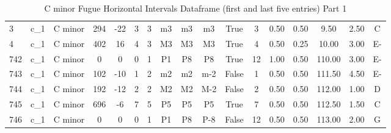 \begin{table}[H]
\begin{tabular}{|lcccccccccccccccc|}
   3   & c\_1 & C minor & 294   & -22                               & 3         & 3                                & m3                          & m3   & m3                            & True      & 3                               & 0.50                        & 0.50                        & 9.50   & 2.50 & C                        \\
   4   & c\_1 & C minor & 402   & 16                                & 4         & 3                                & M3                          & M3   & M3                            & True      & 4                               & 0.50                        & 0.25                        & 10.00  & 3.00 & E-                       \\
   742 & c\_1 & C minor & 0     & 0                                 & 0         & 1                                & P1                          & P8   & P8                            & True      & 12                              & 1.00                        & 0.50                        & 110.00 & 3.00 & E-                       \\
   743 & c\_1 & C minor & 102   & -10                               & 1         & 2                                & m2                          & m2   & m-2                           & False     & 1                               & 0.50                        & 0.50                        & 111.50 & 4.50 & E-                       \\
   744 & c\_1 & C minor & 192   & -12                               & 2         & 2                                & M2                          & M2   & M-2                           & False     & 2                               & 0.50                        & 0.50                        & 112.00 & 1.00 & D                        \\
   745 & c\_1 & C minor & 696   & -6                                & 7         & 5                                & P5                          & P5   & P5                            & True      & 7                               & 0.50                        & 0.50                        & 112.50 & 1.50 & C                        \\
   746 & c\_1 & C minor & 0     & 0                                 & 0         & 1                                & P1                          & P8   & P-8                           & False     & 12                              & 0.50                        & 0.50                        & 113.00 & 2.00 & G                        \\
   \hline
\end{tabular}
\caption{C minor Fugue Horizontal Intervals Dataframe (first and last five entries) Part 1}
\end{table}
 
